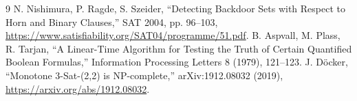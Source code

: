 \documentclass[11pt]{article}
\begin{document}
\begin{thebibliography}{9}
 N. Nishimura, P. Ragde, S. Szeider, ``Detecting Backdoor Sets with Respect to Horn and Binary Clauses,'' SAT 2004, pp. 96--103, \url{https://www.satisfiability.org/SAT04/programme/51.pdf}.
 B. Aspvall, M. Plass, R. Tarjan, ``A Linear-Time Algorithm for Testing the Truth of Certain Quantified Boolean Formulas,'' Information Processing Letters 8 (1979), 121--123.
 J. D\"ocker, ``Monotone 3-Sat-(2,2) is NP-complete,'' arXiv:1912.08032 (2019), \url{https://arxiv.org/abs/1912.08032}.
\end{thebibliography}
\end{document}
